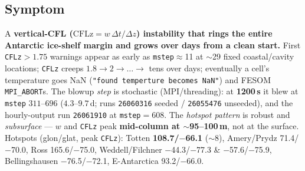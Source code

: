 \documentclass[11pt,a4paper]{article}
\newcommand{\code}[1]{\texttt{\small #1}}
\begin{document}
\subsection{Symptom}
A \textbf{vertical-CFL ($\mathrm{CFLz}=w\,\Delta t/\Delta z$) instability that rings the
entire Antarctic ice-shelf margin and grows over days from a clean start.} First
\code{CFLz}$>1.75$ warnings appear as early as \code{mstep}$\approx$11 at $\sim$29 fixed
coastal/cavity locations; \code{CFLz} creeps $1.8\to2\to\dots\to$ tens over days; eventually
a cell's temperature goes NaN (\code{"found temperture becomes NaN"}) and FESOM
\code{MPI\_ABORT}s. The blowup \emph{step} is stochastic (MPI/threading): at
\textbf{1200\,s} it blew at \code{mstep} $311$--$696$ ($4.3$--$9.7$\,d; runs \code{26060316}
seeded / \code{26055476} unseeded), and the hourly-output run \code{26061910} at
\code{mstep}$=608$. The \emph{hotspot pattern} is robust and \emph{subsurface} --- $w$ and
\code{CFLz} peak \textbf{mid-column at $\sim$95--100\,m}, not at the surface. Hotspots
(glon/glat, peak \code{CFLz}): Totten \textbf{108.7/$-$66.1} ($\sim$8), Amery/Prydz
71.4/$-$70.0, Ross 165.6/$-$75.0, Weddell/Filchner $-$44.3/$-$77.3 \& $-$57.6/$-$75.9,
Bellingshausen $-$76.5/$-$72.1, E-Antarctica 93.2/$-$66.0.
\end{document}

